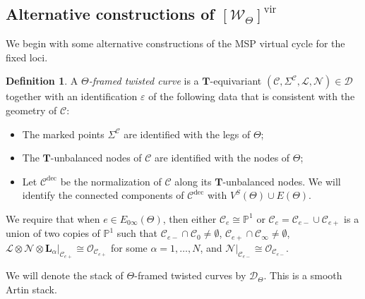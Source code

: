\documentclass{amsart}
\theoremstyle{definition}
\newtheorem{defn}[thm]{Definition}
\theoremstyle{remark}
\theoremstyle{plain}
\theoremstyle{definition}
\theoremstyle{remark}
\newcommand{\T}{\mathbf{T}}
\renewcommand{\P}{\mathbb{P}}
\newcommand{\ep}{\varepsilon}
\newcommand{\mc}[1]{\mathcal{#1}}
\newcommand{\mbf}[1]{\mathbf{#1}}
\newcommand{\mr}[1]{\mathrm{#1}}
\newcommand{\1}{\mathbf{1}}
\newcommand{\2}{\mathbf{2}}
\newcommand{\3}{\mathbf{3}}
\newcommand{\vir}{\mr{vir}}
\begin{document}
\subsection{Alternative constructions of $[ \mc{W}_{\Theta} ]^{\vir}$}%
\label{sub:Alternative constructions of virtual cycle}

We begin with some alternative constructions of the MSP virtual cycle for the fixed loci. 
\begin{defn}
    A \textit{$\Theta$-framed twisted curve} is a $\T$-equivariant $(\mc{C}, \Sigma^{\mc{C}}, \mc{L}, \mc{N}) \in \mc{D}$ together with an identification $\ep$ of the following data that is consistent with the geometry of $\mc{C}$:
    \begin{itemize}
        \item The marked points $\Sigma^{\mc{C}}$ are identified with the legs of $\Theta$;
        \item The $\T$-unbalanced nodes of $\mc{C}$ are identified with the nodes of $\Theta$;
        \item Let $\mc{C}^{\mr{dec}}$ be the normalization of $\mc{C}$ along its $\T$-unbalanced nodes. We will identify the connected components of $\mc{C}^{\mr{dec}}$ with $V^S(\Theta) \cup E(\Theta)$.
    \end{itemize}
    We require that when $e \in E_{0\infty}(\Theta)$, then either $\mc{C}_e \cong \P^1$ or $\mc{C}_e = \mc{C}_{e-} \cup \mc{C}_{e+}$ is a union of two copies of $\P^1$ such that $\mc{C}_{e-} \cap \mc{C}_0 \neq \emptyset$, $\mc{C}_{e+} \cap \mc{C}_{\infty} \neq \emptyset$, $\mc{L}\otimes \mc{N} \otimes \mbf{L}_{\alpha}|_{\mc{C}_{e+}} \cong \mc{O}_{\mc{C}_{e+}}$ for some $\alpha = 1, \ldots, N$, and $\mc{N}|_{\mc{C}_{e-}} \cong \mc{O}_{\mc{C}_{e-}}$.
\end{defn}

We will denote the stack of $\Theta$-framed twisted curves by $\mc{D}_{\Theta}$. This is a smooth Artin stack.
\end{document}
